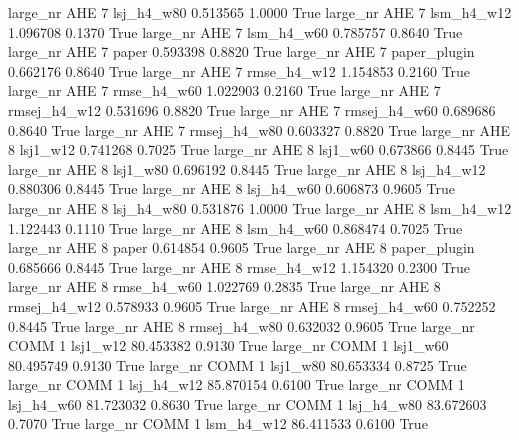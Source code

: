   large_nr      AHE                 7   lsj_h4_w80    0.513565      1.0000    True
  large_nr      AHE                 7   lsm_h4_w12    1.096708      0.1370    True
  large_nr      AHE                 7   lsm_h4_w60    0.785757      0.8640    True
  large_nr      AHE                 7        paper    0.593398      0.8820    True
  large_nr      AHE                 7 paper_plugin    0.662176      0.8640    True
  large_nr      AHE                 7  rmse_h4_w12    1.154853      0.2160    True
  large_nr      AHE                 7  rmse_h4_w60    1.022903      0.2160    True
  large_nr      AHE                 7 rmsej_h4_w12    0.531696      0.8820    True
  large_nr      AHE                 7 rmsej_h4_w60    0.689686      0.8640    True
  large_nr      AHE                 7 rmsej_h4_w80    0.603327      0.8820    True
  large_nr      AHE                 8     lsj1_w12    0.741268      0.7025    True
  large_nr      AHE                 8     lsj1_w60    0.673866      0.8445    True
  large_nr      AHE                 8     lsj1_w80    0.696192      0.8445    True
  large_nr      AHE                 8   lsj_h4_w12    0.880306      0.8445    True
  large_nr      AHE                 8   lsj_h4_w60    0.606873      0.9605    True
  large_nr      AHE                 8   lsj_h4_w80    0.531876      1.0000    True
  large_nr      AHE                 8   lsm_h4_w12    1.122443      0.1110    True
  large_nr      AHE                 8   lsm_h4_w60    0.868474      0.7025    True
  large_nr      AHE                 8        paper    0.614854      0.9605    True
  large_nr      AHE                 8 paper_plugin    0.685666      0.8445    True
  large_nr      AHE                 8  rmse_h4_w12    1.154320      0.2300    True
  large_nr      AHE                 8  rmse_h4_w60    1.022769      0.2835    True
  large_nr      AHE                 8 rmsej_h4_w12    0.578933      0.9605    True
  large_nr      AHE                 8 rmsej_h4_w60    0.752252      0.8445    True
  large_nr      AHE                 8 rmsej_h4_w80    0.632032      0.9605    True
  large_nr     COMM                 1     lsj1_w12   80.453382      0.9130    True
  large_nr     COMM                 1     lsj1_w60   80.495749      0.9130    True
  large_nr     COMM                 1     lsj1_w80   80.653334      0.8725    True
  large_nr     COMM                 1   lsj_h4_w12   85.870154      0.6100    True
  large_nr     COMM                 1   lsj_h4_w60   81.723032      0.8630    True
  large_nr     COMM                 1   lsj_h4_w80   83.672603      0.7070    True
  large_nr     COMM                 1   lsm_h4_w12   86.411533      0.6100    True

